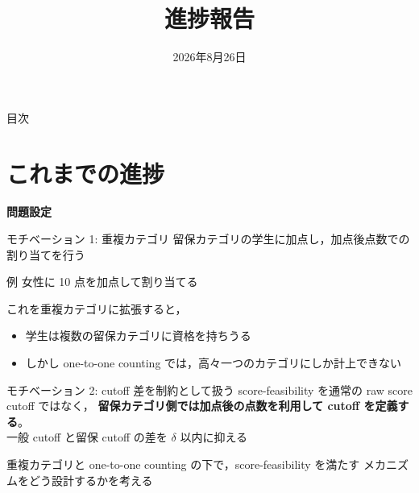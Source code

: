 \documentclass[aspectratio=43,11pt]{beamer}
\title{進捗報告}
\author{}
\date{2026年8月26日}
\begin{document}
\begin{frame}
  \titlepage
\end{frame}

\begin{frame}{目次}
  \tableofcontents
\end{frame}

\section{これまでの進捗}

\begin{frame}
  \centering
  {\LARGE\bfseries 問題設定}
\end{frame}

\begin{frame}{モチベーション 1: 重複カテゴリ}
  留保カテゴリの学生に加点し，加点後点数での割り当てを行う

  \begin{block}{例}
    女性に 10 点を加点して割り当てる
  \end{block}

  これを重複カテゴリに拡張すると，
  \begin{itemize}
    \item 学生は複数の留保カテゴリに資格を持ちうる
    \item しかし one-to-one counting では，高々一つのカテゴリにしか計上できない
  \end{itemize}
\end{frame}

\begin{frame}{モチベーション 2: cutoff 差を制約として扱う}
  score-feasibility を通常の raw score cutoff ではなく，
  \textbf{留保カテゴリ側では加点後の点数を利用して cutoff を定義する}。\\
  一般 cutoff と留保 cutoff の差を $\delta$ 以内に抑える

  \vspace{1em}
  重複カテゴリと one-to-one counting の下で，score-feasibility を満たす
  メカニズムをどう設計するかを考える
\end{frame}
\end{document}
